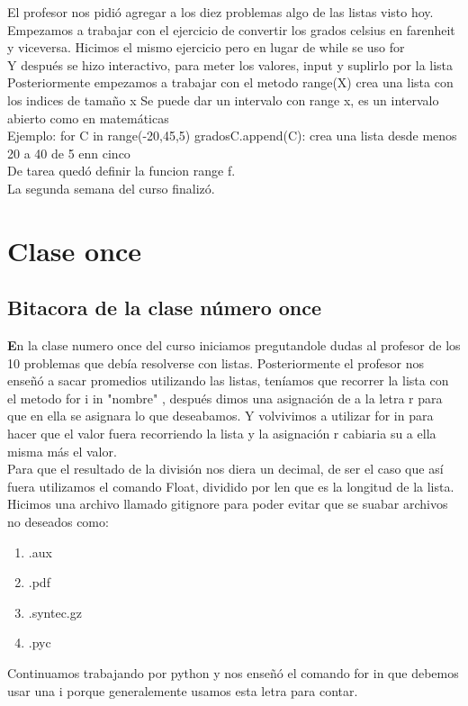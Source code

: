 \documentclass{book}
\begin{document}
El profesor nos pidió agregar a los diez problemas algo de las listas visto hoy.\\
Empezamos a trabajar con el ejercicio de convertir los grados celsius en farenheit y viceversa. Hicimos el mismo ejercicio pero en lugar de while se uso for \\
Y después se hizo interactivo, para meter los valores, input y suplirlo por la lista\\
Posteriormente empezamos a trabajar con el metodo range(X) crea una lista con los indices de tamaño x
Se puede dar un intervalo con range x, es un intervalo abierto como en matemáticas\\
Ejemplo: for C in range(-20,45,5) gradosC.append(C): crea una lista desde menos 20 a 40 de 5 enn cinco\\
De tarea quedó definir la funcion range f. \\
La segunda semana del curso finalizó.

\chapter{Clase once}
\section{Bitacora de la clase número once}
\textbf En la clase numero once del curso iniciamos pregutandole dudas al profesor de los 10 problemas que debía resolverse con listas.
Posteriormente el profesor nos enseñó a sacar promedios utilizando las listas, teníamos que recorrer la lista con el metodo 	\color{blue}for i in "nombre" \color{black}, después dimos una asignación de a la letra r para que en ella se asignara lo que deseabamos. Y volvivimos a utilizar \color{blue} for in \color{black} para hacer que el valor fuera recorriendo la lista y la asignación r cabiaria su a ella misma más el valor.\\
Para que el resultado de la división nos diera un decimal, de ser el caso que así fuera utilizamos el comando \color{blue} Float, \color{black} dividido por \color{blue} len \color{black} que es la longitud de la lista.\\

Hicimos una archivo llamado \color{blue} gitignore \color{black}para poder evitar que se suabar archivos no deseados como:
\begin{enumerate}
	\item .aux 
	\item .pdf 
	\item.syntec.gz 
	\item .pyc
\end{enumerate}
Continuamos trabajando por python y nos enseñó el comando \color{blue} for in \color{black} que debemos usar una i porque generalemente usamos esta letra para contar.\\
\end{document}

